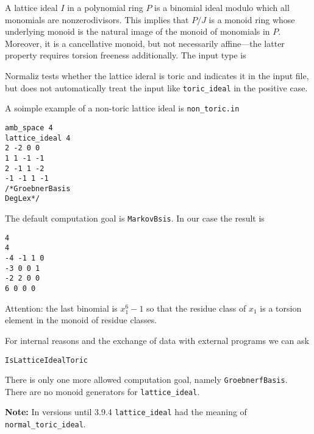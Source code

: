 A lattice ideal $I$ in a polynomial ring $P$ is a binomial ideal modulo which all monomials are nonzerodivisors. This implies that $P/J$ is a monoid ring whose underlying monoid is the natural image of the monoid of monomials in $P$. Moreover, it is a cancellative monoid, but not necessarily affine---the latter property requires torsion freeness additionally. The input type is
\begin{itemize}
\end{itemize}
Normaliz tests whether the lattice ideral is toric and indicates it in the input file, but does not automatically treat the input like \verb|toric_ideal| in the positive case.

A soimple example of a non-toric lattice ideal is \verb|non_toric.in|
\begin{Verbatim}
amb_space 4
lattice_ideal 4
2 -2 0 0
1 1 -1 -1
2 -1 1 -2
-1 -1 1 -1
/*GroebnerBasis
DegLex*/
\end{Verbatim}
The default computation goal is \verb|MarkovBsis|. In our case the result is
\begin{Verbatim}
4
4
-4 -1 1 0 
-3 0 0 1 
-2 2 0 0 
6 0 0 0
\end{Verbatim}
Attention: the last binomial is $x_1^6-1$ so that the residue class of $x_1$ is a torsion element in the monoid of residue classes.

For internal reasons and the exchange of data with external programs we can ask
\begin{Verbatim}
IsLatticeIdealToric
\end{Verbatim}

There is only one more allowed computation goal, namely \verb|GroebnerfBasis|. There are no monoid generators for \verb|lattice_ideal|.

\textbf{Note:} In versions until 3.9.4 \verb|lattice_ideal| had the meaning of \verb|normal_toric_ideal|.